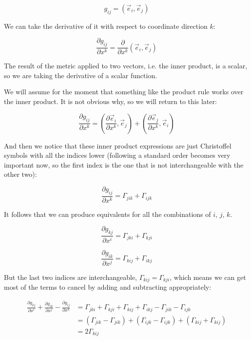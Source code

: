 \begin{equation}
g_{ij} = \left( \vec{e}_i,\vec{e}_j \right)
\end{equation}

We can take the derivative of it with respect to coordinate direction $k$:

\begin{equation}
\frac{\partial g_{ij}}{\partial x^k} 
=
\frac{\partial}{\partial x^k}
\left(
\vec{e}_i,\vec{e}_j
 \right)
\end{equation}

The result of the metric applied to two vectors, i.e. the inner product, is a scalar, so we are taking the derivative of a scalar function.

We will assume for the moment that something like the product rule works over the inner product. It is not obvious why, so we will return to this later:

\begin{equation}
\frac{\partial g_{ij}}{\partial x^k} 
=
\left(
\frac{\partial \vec{e}_i}{\partial x^k}
,\vec{e}_j
 \right)
+
\left(
\frac{\partial \vec{e}_j}{\partial x^k}
,\vec{e}_i
 \right)
\end{equation}

And then we notice that these inner product expressions are just Christoffel symbols with all the indices lower (following a standard order becomes very important now, so the first index is the one that is not interchangeable with the other two):

\begin{equation}
\frac{\partial g_{ij}}{\partial x^k} 
=
\Gamma_{jik}+\Gamma_{ijk}
\end{equation}

It follows that we can produce equivalents for all the combinations of $i$, $j$, $k$.

\begin{equation}
\frac{\partial g_{kj}}{\partial x^i} 
=
\Gamma_{jki}+\Gamma_{kji}
\end{equation}

\begin{equation}
\frac{\partial g_{ik}}{\partial x^j} 
=
\Gamma_{kij}+\Gamma_{ikj}
\end{equation}

But the last two indices are interchangeable, $\Gamma_{kij} = \Gamma_{kji}$, which means we can get most of the terms to cancel by adding and subtracting appropriately:

\begin{equation}
    \begin{split}
        \frac{\partial g_{kj}}{\partial x^i} 
        +
        \frac{\partial g_{ik}}{\partial x^j} 
        -
        \frac{\partial g_{ij}}{\partial x^k}
        &=
        \Gamma_{jki}+\Gamma_{kji}
        +
        \Gamma_{kij}+\Gamma_{ikj}
        -
        \Gamma_{jik}-\Gamma_{ijk} \\
        &=        
        (\Gamma_{jik}-\Gamma_{jik})
        +
        (\Gamma_{ijk}-\Gamma_{ijk})
        +
        (\Gamma_{kij}+\Gamma_{kij}) \\
        &= 2\Gamma_{kij}       
    \end{split}
\end{equation}

